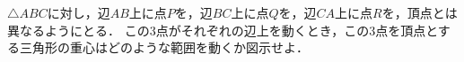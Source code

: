 \documentclass[../../main.tex]{subfiles}
\begin{document}
$\triangle ABC$に対し，辺$AB$上に点$P$を，辺$BC$上に点$Q$を，辺$CA$上に点$R$を，頂点とは異なるようにとる．
この3点がそれぞれの辺上を動くとき，この3点を頂点とする三角形の重心はどのような範囲を動くか図示せよ．
\end{document}
